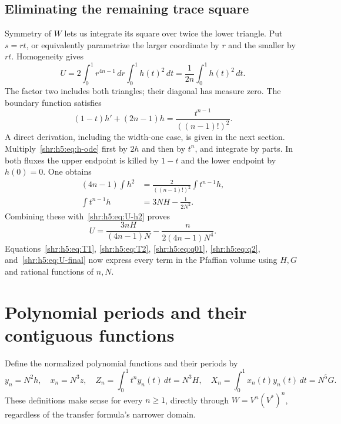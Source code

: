 \documentclass[11pt,letterpaper]{article}
\numberwithin{equation}{section}
\theoremstyle{definition}
\newcommand{\1}{\mathbf 1}
\newcommand{\dd}{\,d}
\begin{document}
\subsection{Eliminating the remaining trace square}
Symmetry of $W$ lets us integrate its square over twice the lower
triangle. Put $s=rt$, or equivalently parametrize the larger coordinate
by $r$ and the smaller by $rt$. Homogeneity gives
\begin{equation}
 U=2\int_0^1r^{4n-1}\dd r\int_0^1h(t)^2\dd t
   =\frac1{2n}\int_0^1h(t)^2\dd t.
 \label{shr:h5:eq:U-h2}
\end{equation}
The factor two includes both triangles; their diagonal has measure zero.
The boundary function satisfies
\begin{equation}
 (1-t)h'+(2n-1)h=\frac{t^{n-1}}{((n-1)!)^2}.
 \label{shr:h5:eq:h-ode}
\end{equation}
A direct derivation, including the width-one case, is given in the next
section. Multiply~\eqref{shr:h5:eq:h-ode} first by $2h$ and then by $t^n$,
and integrate by parts. In both fluxes the upper endpoint is killed by
$1-t$ and the lower endpoint by $h(0)=0$. One obtains
\begin{align}
 (4n-1)\int h^2&=\frac2{((n-1)!)^2}\int t^{n-1}h,\\
 \int t^{n-1}h&=3NH-\frac1{2N^2}.
\end{align}
Combining these with~\eqref{shr:h5:eq:U-h2} proves
\begin{equation}
 U=\frac{3nH}{(4n-1)N}-\frac{n}{2(4n-1)N^4}.
 \label{shr:h5:eq:U-final}
\end{equation}
Equations~\eqref{shr:h5:eq:T1}, \eqref{shr:h5:eq:T2}, \eqref{shr:h5:eq:q01},
\eqref{shr:h5:eq:q2}, and~\eqref{shr:h5:eq:U-final} now express every term in the
Pfaffian volume using $H,G$ and rational functions of $n,N$.

\section{Polynomial periods and their contiguous functions}
\label{shr:h5:sec:periods}
Define the normalized polynomial functions and their periods by
\begin{equation}
 y_n=N^2h,\quad x_n=N^3z,\quad
 Z_n=\int_0^1t^ny_n(t)\dd t=N^3H,\quad
 X_n=\int_0^1x_n(t)y_n(t)\dd t=N^5G.
 \label{shr:h5:eq:periods}
\end{equation}
These definitions make sense for every $n\ge1$, directly through
$W=V^n(V^*)^n$, regardless of the transfer formula's narrower domain.
\end{document}
